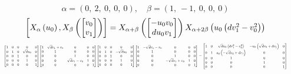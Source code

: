 \documentclass[11pt]{article}
\theoremstyle{definition}
\begin{document}
\[
\alpha = \left( 0, \  2, \  0, \  0, \  0\right), \quad \beta = \left( 1, \  -1, \  0, \  0, \  0\right)
\]
\[
\scaletoalign{\textwidth}{\left[ X_{\alpha}\left(u_{0}\right), X_{\beta}\left(\left[\begin{matrix}v_{0}\\v_{1}\end{matrix}\right]\right) \right] = X_{\alpha + \beta}\left(\left[\begin{matrix}- u_{0} v_{0}\\d u_{0} v_{1}\end{matrix}\right]\right) X_{\alpha + 2\beta}\left(u_{0} \left(d v_{1}^{2} - v_{0}^{2}\right)\right)}
\]
\[
\scaletoalign{\textwidth}{{\left[\begin{matrix}1 & 0 & 0 & 0 & 0\\0 & 1 & 0 & \sqrt{d} u_{0} & 0\\0 & 0 & 1 & 0 & 0\\0 & 0 & 0 & 1 & 0\\0 & 0 & 0 & 0 & 1\end{matrix}\right]} {\left[\begin{matrix}1 & \sqrt{d} v_{1} + v_{0} & 0 & 0 & 0\\0 & 1 & 0 & 0 & 0\\0 & 0 & 1 & 0 & 0\\0 & 0 & \sqrt{d} v_{1} - v_{0} & 1 & 0\\0 & 0 & 0 & 0 & 1\end{matrix}\right]} {\left[\begin{matrix}1 & 0 & 0 & 0 & 0\\0 & 1 & 0 & - \sqrt{d} u_{0} & 0\\0 & 0 & 1 & 0 & 0\\0 & 0 & 0 & 1 & 0\\0 & 0 & 0 & 0 & 1\end{matrix}\right]} {\left[\begin{matrix}1 & - \sqrt{d} v_{1} - v_{0} & 0 & 0 & 0\\0 & 1 & 0 & 0 & 0\\0 & 0 & 1 & 0 & 0\\0 & 0 & - \sqrt{d} v_{1} + v_{0} & 1 & 0\\0 & 0 & 0 & 0 & 1\end{matrix}\right]} = {\left[\begin{matrix}1 & 0 & \sqrt{d} u_{0} \left(d v_{1}^{2} - v_{0}^{2}\right) & - u_{0} \left(\sqrt{d} v_{0} + d v_{1}\right) & 0\\0 & 1 & u_{0} \left(- \sqrt{d} v_{0} + d v_{1}\right) & 0 & 0\\0 & 0 & 1 & 0 & 0\\0 & 0 & 0 & 1 & 0\\0 & 0 & 0 & 0 & 1\end{matrix}\right]}}
\]
\end{document}
